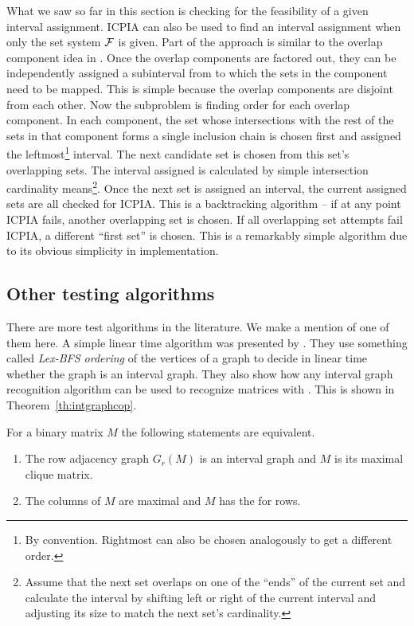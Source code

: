 What we saw so far in this section is checking for the feasibility of
a given interval assignment. ICPIA can also be used to find an
interval assignment when only the set system ${\cal F}$ is given. Part of
the approach is similar to the overlap component idea in \cite{fg65,
  wlh02}. Once the overlap components are factored out, they can be
independently assigned a subinterval from to which the sets in the
component need to be mapped. This is simple because the overlap
components are disjoint from each other. Now the subproblem is finding
\COP order for each overlap component. In each component, the set
whose intersections with the rest of the sets in that component forms
a single inclusion chain is chosen first and assigned the
leftmost\footnote{By convention. Rightmost can also be chosen
  analogously to get a different \COP order.} interval. The next
candidate set is chosen from this set's overlapping sets. The interval
assigned is calculated by simple intersection cardinality
means\footnote{Assume that the next set overlaps on one of the
  ``ends'' of the current set and calculate the interval by shifting
  left or right of the current interval and adjusting its size to
  match the next set's cardinality.}. Once the next set is assigned an
interval, the current assigned sets are all checked for ICPIA. This is
a backtracking algorithm -- if at any point ICPIA fails, another
overlapping set is chosen. If all overlapping set attempts fail ICPIA,
a different ``first set'' is chosen. This is a remarkably simple
algorithm due to its obvious simplicity in implementation.

\subsection{Other \COP testing algorithms}
There are more \COP test algorithms in the literature. We make a
mention of one of them here.  A simple linear time algorithm was
presented by \cite{hmpv00}. They use something called {\em Lex-BFS
  ordering} of the vertices of a graph to decide in linear time
whether the graph is an interval graph. They also show how any
interval graph recognition algorithm can be used to recognize matrices
with \COP. This is shown in Theorem~\ref{th:intgraphcop}.

\begin{theoremsansproof}
  \label{th:intgraphcop}
  For a binary matrix $M$ the following statements are equivalent.
  \begin{enumerate}
  \item The row adjacency graph $G_r(M)$ is an interval graph and $M$
    is its maximal clique matrix.
  \item The columns of $M$ are maximal and $M$ has the \COP for rows.
  \end{enumerate}
\end{theoremsansproof}

